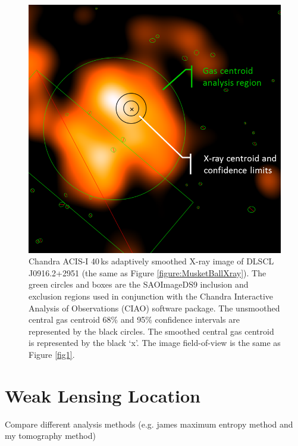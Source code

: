 \begin{figure}
\centering
\includegraphics[width=5in]{Chapter4/XrayCentRegions_reformat.png}
\caption[Musket Ball Cluster X-ray map with estimated centroid.]{
Chandra ACIS-I 40\,ks adaptively smoothed X-ray image of DLSCL J0916.2+2951 (the same as Figure \ref{figure:MusketBallXray}).
The green circles and boxes are the SAOImageDS9 inclusion and exclusion regions used in conjunction with the Chandra Interactive Analysis of Observations (CIAO) software package.
The unsmoothed central gas centroid 68\% and 95\% confidence intervals are represented by the black circles.
The smoothed central gas centroid is represented by the black `x'.
The image field-of-view is the same as Figure \ref{fig1}.
}
\label{figure:XrayCentroid}
\end{figure}


\section{Weak Lensing Location}\label{section:WLLocation}

Compare different analysis methods (e.g. james maximum entropy method and my tomography method)

